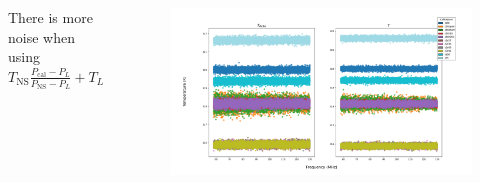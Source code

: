 \documentclass[aspectratio=169]{beamer}
\begin{document}
\begin{frame}

	\begin{columns}
		\begin{column}{0.2\textwidth}
			There is more noise when using $T_{\text{NS}} \frac{P_{\text{cal}} - P_L}{P_{\text{NS}} - P_L} + T_L$
		\end{column}
		\begin{column}{0.8\textwidth}
			\begin{figure}[h]
				\centering
				\includegraphics[width=1\textwidth]{images/main_scatter_plots.png}
			\end{figure}
		\end{column}
	\end{columns}

\end{frame}
\end{document}
